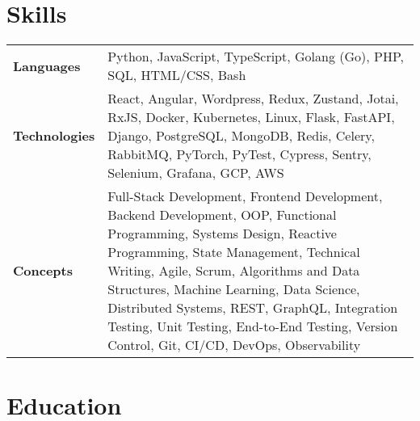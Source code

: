 \documentclass{ethan_cv}
\begin{document}
    \section{Skills}
        \small
        \begin{tabular}{p{2.25cm} p{16cm}}
            \textbf{Languages} & Python, JavaScript, TypeScript, Golang (Go), PHP, SQL, HTML/CSS, Bash \\ 
            \addlinespace[2mm]
            \textbf{Technologies} & React, Angular, Wordpress, Redux, Zustand, Jotai, RxJS, Docker, Kubernetes, Linux, Flask, FastAPI, Django, PostgreSQL, MongoDB, Redis, Celery, RabbitMQ, PyTorch, PyTest, Cypress, Sentry, Selenium, Grafana, GCP, AWS \\
            \addlinespace[2mm]
            \textbf{Concepts} & Full-Stack Development, Frontend Development, Backend Development, OOP, Functional Programming, Systems Design, Reactive Programming, State Management, Technical Writing, Agile, Scrum, Algorithms and Data Structures, Machine Learning, Data Science, Distributed Systems, REST, GraphQL, Integration Testing, Unit Testing, End-to-End Testing, Version Control, Git, CI/CD, DevOps, Observability
        \end{tabular}
    \vspace{+3mm}


\section{Education}
\end{document}
